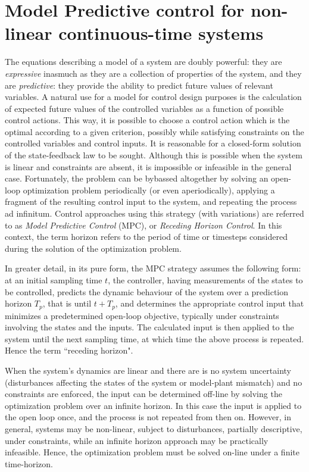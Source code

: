 \section{Model Predictive control for non-linear continuous-time systems}

The equations describing a model of a system are doubly powerful: they
are \textit{expressive} inasmuch as they are a collection of properties of the
system, and they are \textit{predictive}: they provide the ability to predict
future values of relevant variables. A natural use for a model for control
design purposes is the calculation of expected future values of the controlled
variables as a function of possible control actions. This way, it is possible
to choose a control action which is the optimal according to a given criterion,
possibly while satisfying constraints on the controlled variables and control
inputs. It is reasonable for a closed-form solution of the state-feedback law
to be sought. Although this is possible when the system is linear and constraints
are absent, it is impossible or infeasible in the general case. Fortunately,
the problem can be bybassed altogether by solving an open-loop optimization
problem periodically (or even aperiodically), applying a fragment of
the resulting control input to the system, and repeating the process ad
infinitum. Control approaches using this strategy (with variations) are referred
to as \textit{Model Predictive Control} (MPC), or \textit{Receding Horizon Control}.
In this context, the term horizon refers to the period of time or timesteps
considered during the solution of the optimization problem.

In greater detail, in its pure form, the MPC strategy assumes the following
form: at an initial sampling time $t$, the controller, having measurements of
the states to be controlled, predicts the dynamic behaviour of the system over a
prediction horizon $T_p$, that is until $t+T_p$, and determines the appropriate
control input that minimizes a predetermined open-loop objective, typically
under constraints involving the states and the inputs. The calculated input
is then applied to the system until the next sampling time, at which time
the above process is repeated. Hence the term ``receding horizon".

When the system's dynamics are linear and there are is no system uncertainty
(disturbances affecting the states of the system or model-plant mismatch)
and no constraints are enforced, the input can be determined off-line by
solving the optimization problem over an infinite horizon. In this case the
input is applied to the open loop once, and the process is not repeated from
then on. However, in general, systems may be non-linear, subject to disturbances,
partially descriptive, under constraints, while an infinite horizon approach
may be practically infeasible. Hence, the optimization problem must be solved
on-line under a finite time-horizon.

